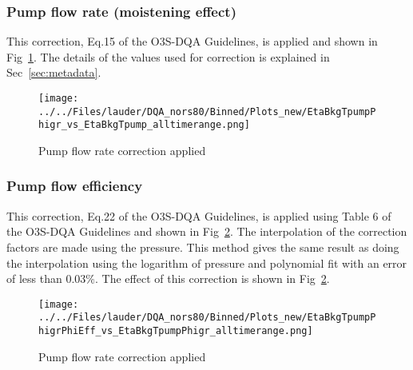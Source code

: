                 \subsubsection{Pump flow rate (moistening effect)}
    This correction, Eq.15 of the O3S-DQA Guidelines, is applied and shown in Fig~\ref{fig:pf_ptu}. The details of the values used for
    correction is explained in Sec~\ref{sec:metadata}.
%
                        \begin{figure}
        \centering
\texttt{[image: ../../Files/lauder/DQA\_nors80/Binned/Plots\_new/EtaBkgTpumpPhigr\_vs\_EtaBkgTpump\_alltimerange.png]}
    \caption{Pump flow rate correction applied}
            \label{fig:pf_ptu}
    \end{figure}
%
                   \subsubsection{Pump flow efficiency}
    This correction, Eq.22 of the O3S-DQA Guidelines, is applied using Table 6 of the O3S-DQA Guidelines and shown in Fig~\ref{fig:pf_eff}.
The interpolation of the correction factors are made using the pressure. This method gives the same result as doing the interpolation using the logarithm of pressure
and polynomial fit with an error of less than $0.03\%$. The effect of this correction is shown in Fig~\ref{fig:pf_eff}.

                        \begin{figure}
        \centering
\texttt{[image: ../../Files/lauder/DQA\_nors80/Binned/Plots\_new/EtaBkgTpumpPhigrPhiEff\_vs\_EtaBkgTpumpPhigr\_alltimerange.png]}
    \caption{Pump flow rate correction applied}
            \label{fig:pf_eff}
    \end{figure}
%

